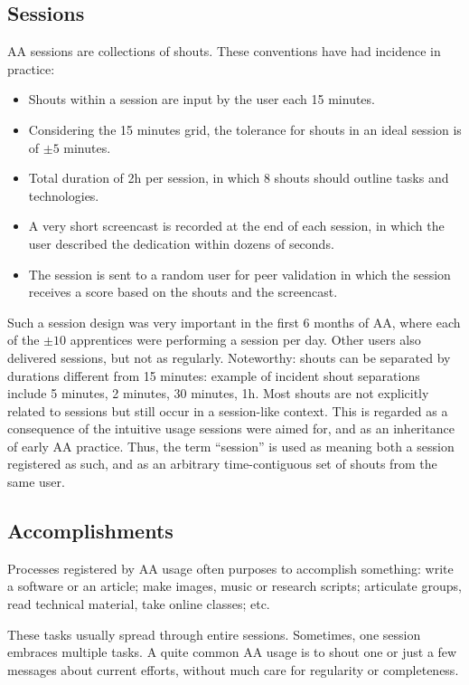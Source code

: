 \documentclass[12pt,fleqn]{article}
\begin{document}
\subsection{Sessions}\label{sec:usess}
AA sessions are collections of shouts.
These conventions have had incidence in practice:
\begin{itemize}
    \item Shouts within a session are input by the user each 15 minutes.
    \item Considering the 15 minutes grid, the tolerance for shouts in an ideal session is of $\pm 5$ minutes.
    \item Total duration of 2h per session, in which 8 shouts should outline tasks and technologies.
    \item A very short screencast is recorded at the end of each session,
	    in which the user described the dedication within dozens of seconds.
    \item The session is sent to a random user for peer validation 
	    in which the session receives a score based on the shouts and the screencast.
\end{itemize}

Such a session design was very important in the first 6 months of AA,
where each of the  $\pm 10$ apprentices were performing a session per day.
Other users also delivered sessions, but not as regularly.
Noteworthy: shouts can be separated by durations different from 15 minutes: 
example of incident shout separations include 5 minutes, 2 minutes, 30 minutes, 1h.
Most shouts are not explicitly related to sessions
but still occur in a session-like context.
This is regarded as a consequence of the intuitive usage
sessions were aimed for, and as an inheritance of early AA practice.
Thus, the term ``session'' is used as meaning both a session registered as such,
and as an arbitrary time-contiguous set of shouts from the same user.

\subsection{Accomplishments}\label{sec:usedev}
Processes registered by AA usage often purposes to accomplish something: 
write a software or an article;
make images, music or research scripts; 
articulate groups, read technical material, take online classes; etc. 

These tasks usually spread through entire sessions.
Sometimes, one session embraces
multiple tasks. A quite common AA usage is to shout one or just a few
messages about current efforts, without much care for regularity or
completeness.
\end{document}
